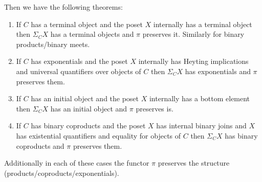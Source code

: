 \documentclass{article}
\begin{document}
Then we have the following theorems:
\begin{enumerate}
\item If $C$ has a terminal object and the poset $X$ internally has a
  terminal object then $\Sigma_C X$ has a terminal objects and $\pi$
  preserves it. Similarly for binary products/binary meets.
\item If $C$ has exponentials and the poset $X$ internally has Heyting
  implications and universal quantifiers over objects of $C$ then
  $\Sigma_C X$ has exponentials and $\pi$ preserves them.
\item If $C$ has an initial object and the poset $X$ internally has a
  bottom element then $\Sigma_C X$ has an initial object and $\pi$
  preserves is.
\item If $C$ has binary coproducts and the poset $X$ has internal
  binary joins and $X$ has existential quantifiers and equality for
  objects of $C$ then $\Sigma_C X$ has binary coproducts and $\pi$
  preserves them.
\end{enumerate}
Additionally in each of these cases the functor $\pi$ preserves the
structure (products/coproducts/exponentials).
\end{document}
